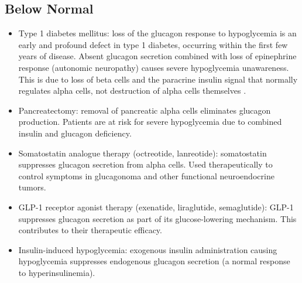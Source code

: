 \subsection*{Below Normal}
\begin{itemize}
  \item Type 1 diabetes mellitus: loss of the glucagon response to hypoglycemia is an early and profound defect in type 1 diabetes, occurring within the first few years of disease. Absent glucagon secretion combined with loss of epinephrine response (autonomic neuropathy) causes severe hypoglycemia unawareness. This is due to loss of beta cells and the paracrine insulin signal that normally regulates alpha cells, not destruction of alpha cells themselves \cite{unger2012glucagonocentric}.
  \item Pancreatectomy: removal of pancreatic alpha cells eliminates glucagon production. Patients are at risk for severe hypoglycemia due to combined insulin and glucagon deficiency.
  \item Somatostatin analogue therapy (octreotide, lanreotide): somatostatin suppresses glucagon secretion from alpha cells. Used therapeutically to control symptoms in glucagonoma and other functional neuroendocrine tumors.
  \item GLP-1 receptor agonist therapy (exenatide, liraglutide, semaglutide): GLP-1 suppresses glucagon secretion as part of its glucose-lowering mechanism. This contributes to their therapeutic efficacy.
  \item Insulin-induced hypoglycemia: exogenous insulin administration causing hypoglycemia suppresses endogenous glucagon secretion (a normal response to hyperinsulinemia).
\end{itemize}

